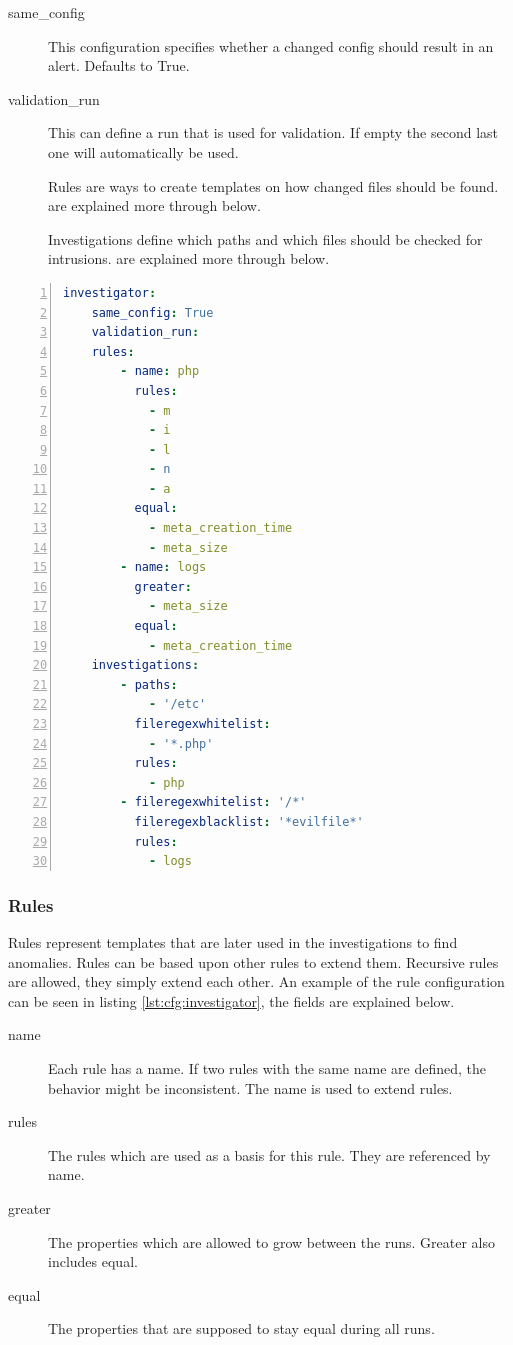 \begin{description}
    \item [same\_config] This configuration specifies whether a changed config should result in an alert. Defaults to True.
    \item [validation\_run] This can define a run that is used for validation. If empty the second last one will automatically be used.
    \item [] Rules are ways to create templates on how changed files should be found.  are explained more through below.
    \item [] Investigations define which paths and which files should be checked for intrusions.  are explained more through below.
\end{description}

\begin{lstlisting}[language=yaml, numbers=left, caption=Investigator Configuration, label=lst:cfg:investigator]
investigator:
	same_config: True
	validation_run: 
	rules: 
		- name: php
		  rules: 
			- m
			- i
			- l
			- n
			- a
		  equal:
			- meta_creation_time
			- meta_size
		- name: logs
		  greater:
			- meta_size
		  equal:
			- meta_creation_time
	investigations:
		- paths:
			- '/etc'
		  fileregexwhitelist:
			- '*.php'
		  rules:
			- php
		- fileregexwhitelist: '/*'
		  fileregexblacklist: '*evilfile*'
		  rules:
			- logs
\end{lstlisting}

\subsubsection{Rules}
\label{sec:config:rules}

Rules represent templates that are later used in the investigations to find anomalies. Rules can be based upon other rules to extend them. Recursive rules are allowed, they simply extend each other. An example of the rule configuration can be seen in listing \ref{lst:cfg:investigator}, the fields are explained below.

\begin{description}
	\item [name] Each rule has a name. If two rules with the same name are defined, the behavior might be inconsistent. The name is used to extend rules.
	\item [rules] The rules which are used as a basis for this rule. They are referenced by name.
	\item [greater] The properties which are allowed to grow between the runs. Greater also includes equal.
	\item [equal] The properties that are supposed to stay equal during all runs.
\end{description}


